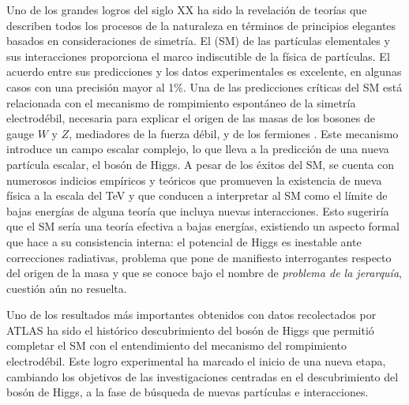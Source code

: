 Uno de los grandes logros del siglo XX ha sido la revelación de teorías que
describen todos los procesos de la naturaleza en términos de principios
elegantes basados en consideraciones de simetría. El {\SM} (SM)
\cite{PhysRevLett.19.1264,PhysRev.127.965,Glashow1961579} de las partículas elementales y sus interacciones proporciona el marco
indiscutible de la física de partículas. El acuerdo entre sus predicciones y
los datos experimentales es excelente, en algunas casos con una precisión
mayor al 1\%. Una de las predicciones críticas del SM está relacionada con
el mecanismo de rompimiento espontáneo de la simetría electrodébil,
necesaria para explicar el origen de las masas de los bosones de gauge $W$ y $Z$,
mediadores de la fuerza débil, y de los fermiones \cite{PhysRevLett.13.321,PhysRevLett.13.508}.
Este mecanismo
introduce un campo escalar complejo, lo que lleva a la predicción de una
nueva partícula escalar, el bosón de Higgs. A pesar de los éxitos del SM, se
cuenta con numerosos indicios empíricos y teóricos que promueven la
existencia de nueva física a la escala del TeV y que conducen a interpretar al
SM como el límite de bajas energías de alguna teoría que incluya nuevas
interacciones. Esto sugeriría que el SM sería una teoría efectiva a bajas
energías, existiendo un aspecto formal que hace a su consistencia interna: el
potencial de Higgs es inestable ante correcciones radiativas, problema que pone
de manifiesto interrogantes respecto del origen de la masa y que se conoce
bajo el nombre de \emph{problema de la jerarquía}, cuestión aún no
resuelta.

Uno de los resultados más importantes obtenidos con datos recolectados por ATLAS ha sido el
histórico descubrimiento del bosón de Higgs\cite{Aad:2012tfa} que permitió
completar el SM con el entendimiento del mecanismo del rompimiento electrodébil.
Este logro experimental ha marcado el inicio de una nueva etapa, cambiando los
objetivos de las investigaciones centradas en el descubrimiento del bosón de
Higgs, a la fase de búsqueda de nuevas partículas e interacciones.

